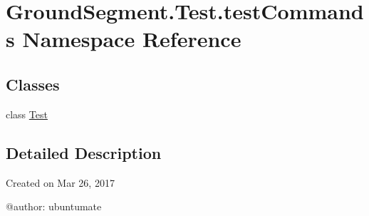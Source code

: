 \hypertarget{namespace_ground_segment_1_1_test_1_1test_commands}{}\section{Ground\+Segment.\+Test.\+test\+Commands Namespace Reference}
\label{namespace_ground_segment_1_1_test_1_1test_commands}
\subsection*{Classes}
\begin{DoxyCompactItemize}
\item 
class \hyperlink{class_ground_segment_1_1_test_1_1test_commands_1_1_test}{Test}
\end{DoxyCompactItemize}


\subsection{Detailed Description}
\begin{DoxyVerb}Created on Mar 26, 2017

@author: ubuntumate
\end{DoxyVerb}
 